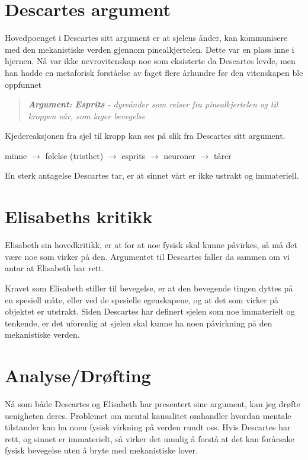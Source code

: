 \documentclass[12pt, a4paper]{article}
\newenvironment{argument}{\begin{quote}\itshape\textbf{Argument: }}{\end{quote}}
\begin{document}
\section{Descartes argument}

Hovedpoenget i Descartes sitt argument er at sjelens ånder, kan kommunisere med den mekanistiske verden gjennom pinealkjertelen. Dette var en plass inne i hjernen. Nå var ikke nevrovitenskap noe som eksisterte da Descartes levde, men han hadde en metaforisk forståelse av faget flere århundre før den vitenskapen ble oppfunnet

\begin{argument}
    \textbf{\textit{Esprits}} - dyreånder som reiser fra pinealkjertelen og til kroppen vår, som lager bevegelse
\end{argument}

Kjedereaksjonen fra sjel til kropp kan ses på slik fra Descartes sitt argument.

minne $\rightarrow$ følelse (tristhet) $\rightarrow$ esprits $\rightarrow$ neuroner $\rightarrow$ tårer


En sterk antagelse Descartes tar, er at sinnet vårt er ikke ustrakt og immateriell.

\section{Elisabeths kritikk}

Elisabeth sin hovedkritikk, er at for at noe fysisk skal kunne påvirkes, så må det være noe som virker på den. Argumentet til Descartes faller da sammen om vi antar at Elisabeth har rett. 

Kravet som Elisabeth stiller til bevegelse, er at den bevegende tingen dyttes på en spesiell måte, eller ved de spesielle egenskapene, og at det som virker på objektet er utstrakt. Siden Descartes har definert sjelen som noe immaterielt og tenkende, er det uforenlig at sjelen skal kunne ha noen påvirkning på den mekanistiske verden. 

\section{Analyse/Drøfting}

Nå som både Descartes og Elisabeth har presentert sine argument, kan jeg drøfte uenigheten deres. Problemet om mental kausalitet omhandler hvordan mentale tilstander kan ha noen fysisk virkning på verden rundt oss. Hvis Descartes har rett, og sinnet er immaterielt, så virker det umulig å forstå at det kan forårsake fysisk bevegelse uten å bryte med mekanistiske lover. 
\end{document}
